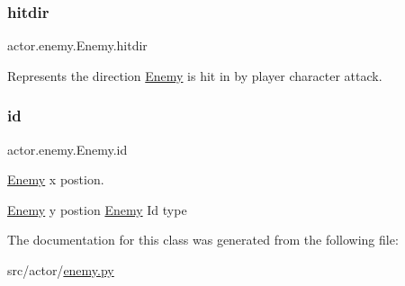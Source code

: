 \subsubsection{\texorpdfstring{hitdir}{hitdir}}
{\footnotesize\ttfamily actor.\+enemy.\+Enemy.\+hitdir}



Represents the direction \hyperlink{classactor_1_1enemy_1_1_enemy}{Enemy} is hit in by player character attack. 

\mbox{\label{classactor_1_1enemy_1_1_enemy_a0e6ba00fdf6dd7aba8b872f7b21040a7}} 
\subsubsection{\texorpdfstring{id}{id}}
{\footnotesize\ttfamily actor.\+enemy.\+Enemy.\+id}



\hyperlink{classactor_1_1enemy_1_1_enemy}{Enemy} x postion. 

\hyperlink{classactor_1_1enemy_1_1_enemy}{Enemy} y postion \hyperlink{classactor_1_1enemy_1_1_enemy}{Enemy} Id type 

The documentation for this class was generated from the following file\+:\begin{DoxyCompactItemize}
\item 
src/actor/\hyperlink{enemy_8py}{enemy.\+py}\end{DoxyCompactItemize}
